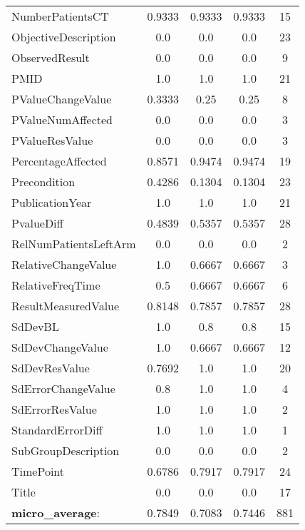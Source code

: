 \begin{longtable}{ l c c c c}
NumberPatientsCT & 0.9333 & 0.9333 & 0.9333 & 15\\
ObjectiveDescription & 0.0 & 0.0 & 0.0 & 23\\
ObservedResult & 0.0 & 0.0 & 0.0 & 9\\
PMID & 1.0 & 1.0 & 1.0 & 21\\
PValueChangeValue & 0.3333 & 0.25 & 0.25 & 8\\
PValueNumAffected & 0.0 & 0.0 & 0.0 & 3\\
PValueResValue & 0.0 & 0.0 & 0.0 & 3\\
PercentageAffected & 0.8571 & 0.9474 & 0.9474 & 19\\
Precondition & 0.4286 & 0.1304 & 0.1304 & 23\\
PublicationYear & 1.0 & 1.0 & 1.0 & 21\\
PvalueDiff & 0.4839 & 0.5357 & 0.5357 & 28\\
RelNumPatientsLeftArm & 0.0 & 0.0 & 0.0 & 2\\
RelativeChangeValue & 1.0 & 0.6667 & 0.6667 & 3\\
RelativeFreqTime & 0.5 & 0.6667 & 0.6667 & 6\\
ResultMeasuredValue & 0.8148 & 0.7857 & 0.7857 & 28\\
SdDevBL & 1.0 & 0.8 & 0.8 & 15\\
SdDevChangeValue & 1.0 & 0.6667 & 0.6667 & 12\\
SdDevResValue & 0.7692 & 1.0 & 1.0 & 20\\
SdErrorChangeValue & 0.8 & 1.0 & 1.0 & 4\\
SdErrorResValue & 1.0 & 1.0 & 1.0 & 2\\
StandardErrorDiff & 1.0 & 1.0 & 1.0 & 1\\
SubGroupDescription & 0.0 & 0.0 & 0.0 & 2\\
TimePoint & 0.6786 & 0.7917 & 0.7917 & 24\\
Title & 0.0 & 0.0 & 0.0 & 17\\
\textbf{micro\_average}: & 0.7849 & 0.7083 & 0.7446 & 881 
\label{tab:Glaucoma_eventextr}
\end{longtable}
